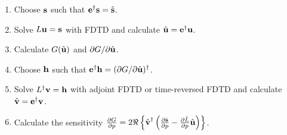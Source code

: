\begin{enumerate}
\item Choose $\textbf{s}$ such that $\textbf{e}^\dagger \textbf{s} = \hat{\textbf{s}}$.
\item Solve $L \textbf{u} = \textbf{s}$ with FDTD and calculate $\hat{\textbf{u}} = \textbf{e}^\dagger \textbf{u}$.
\item Calculate $G(\hat{\textbf{u}})$ and $\partial{G}/\partial{\hat{\textbf{u}}}$.
\item Choose $\textbf{h}$ such that $\textbf{e}^\dagger \textbf{h} = ( \partial{G}/\partial{\hat{\textbf{u}}})^\dagger$.
\item Solve $L^\dagger \textbf{v} = \textbf{h}$ with adjoint FDTD or time-reversed FDTD and calculate $\hat{\textbf{v}} = \textbf{e}^\dagger \textbf{v}$.
\item Calculate the sensitivity $\frac{\partial{G}}{\partial{p}} = 2 \Re \left\{ \hat{\textbf{v}}^\dagger \left( \frac{\partial{\hat{\textbf{s}}}}{\partial{p}} - \frac{\partial{\hat L}}{\partial{p}} \hat{\textbf{u}} \right) \right\}$.
\end{enumerate}




